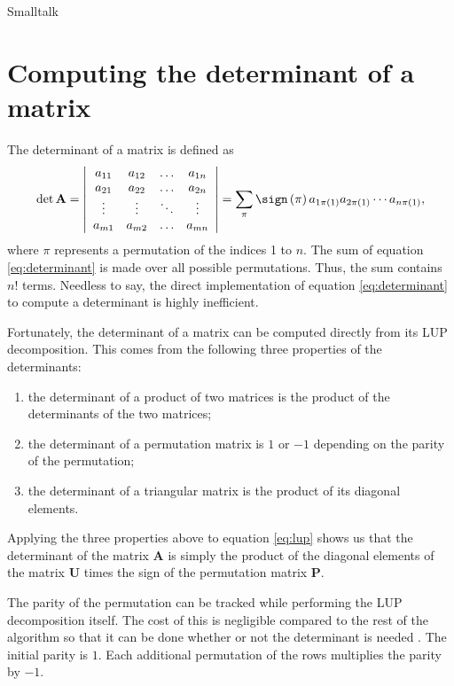 \begin{displaycode}{Smalltalk}
\section{Computing the determinant of a matrix}
\label{sec:determinant} The determinant of a matrix is defined
as
\begin{equation}
\label{eq:determinant}
  \det\textbf{A}=\left|
  \begin{array}{cccc}a_{11}& a_{12}&\ldots& a_{1n}\\
  a_{21}& a_{22}&\ldots& a_{2n}\\
  \vdots&\vdots&\ddots&\vdots\\
  a_{m1}& a_{m2}&\ldots& a_{mn}\\ \end{array}
  \right|=\sum_{\pi}\sign\left({\pi}\right) a_{1\pi\left(1\right)}a_{2\pi\left(1\right)}
  \cdots a_{n\pi\left(1\right)},
\end{equation}
where $\pi$ represents a permutation of the indices 1 to $n$. The
sum of equation \ref{eq:determinant} is made over all possible
permutations. Thus, the sum contains $n!$ terms. Needless to say,
the direct implementation of equation \ref{eq:determinant} to
compute a determinant is highly inefficient.

Fortunately, the determinant of a matrix can be computed directly
from its LUP decomposition. This comes from the following three
properties of the determinants:
\begin{enumerate}
  \item the determinant of a product of two matrices is the product of the determinants of the two
  matrices;
  \item the determinant of a permutation matrix is $1$ or $-1$ depending on the parity of the
  permutation;
  \item the determinant of a triangular matrix is the product of its diagonal elements.
\end{enumerate}
Applying the three properties above to equation \ref{eq:lup} shows
us that the determinant of the matrix $\textbf{A}$ is simply the
product of the diagonal elements of the matrix $\textbf{U}$ times the
sign of the permutation matrix $\textbf{P}$.

The parity of the permutation can be tracked while performing the
LUP decomposition itself. The cost of this is negligible compared
to the rest of the algorithm so that it can be done whether or not
the determinant is needed . The initial parity is $1$. Each
additional permutation of the rows multiplies the parity by $-1$.


\end{displaycode}
